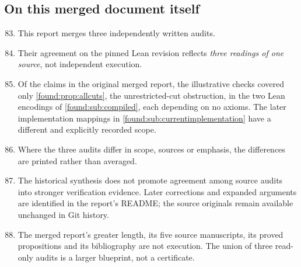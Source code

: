 \documentclass[11pt,letterpaper]{article}
\numberwithin{equation}{section}
\theoremstyle{definition}
\theoremstyle{remark}
\begin{document}
\subsection{On this merged document itself}
\label{found:app:limmerged}
\begin{enumerate}\setcounter{enumi}{82}
\item This report merges three independently written audits.
\item Their agreement on the pinned Lean revision reflects \emph{three readings
of one source}, not independent execution.
\item Of the claims in the original merged report, the illustrative checks
covered only \cref{found:prop:allcuts}, the unrestricted-cut obstruction, in
the two Lean encodings of \cref{found:sub:compiled}, each depending on no
axioms. The later implementation mappings in
\cref{found:sub:currentimplementation} have a different and explicitly recorded
scope.
\item Where the three audits differ in scope, sources or emphasis, the
differences are printed rather than averaged.
\item The historical synthesis does not promote agreement among source audits
into stronger verification evidence. Later corrections and expanded arguments
are identified in the report's README; the source originals remain available
unchanged in Git history.
\item The merged report's greater length, its five source manuscripts, its
proved propositions and its bibliography are not execution. The union of three
read-only audits is a larger blueprint, not a certificate.
\end{enumerate}
\end{document}
